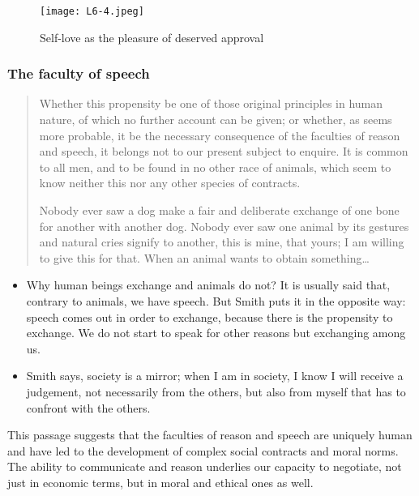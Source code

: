             \begin{figure}[h]
                \centering
                \texttt{[image: L6-4.jpeg]}
                \caption{Self-love as the pleasure of  deserved approval}
                \label{fig:enter-label}
            \end{figure}

\newpage
        \subsubsection{The faculty of speech}

            \begin{quote}
                Whether this propensity be one of those original principles in human nature, of which no further account can be given; or whether, as seems more probable, it be the necessary consequence of the faculties of reason and speech, it belongs not to our present subject to enquire. It is common to all men, and to be found in no other race of animals, which seem to know neither this nor any other species of contracts.
                
                Nobody ever saw a dog make a fair and deliberate exchange of one bone for another with another dog. Nobody ever saw one animal by its gestures and natural cries signify to another, this is mine, that yours; I am willing to give this for that. When an animal wants to obtain something…
            \end{quote}

             \begin{itemize}
                \item Why human beings exchange and animals do not? It is usually said that, contrary to animals, we have speech. But Smith puts it in the opposite way: speech comes out in order to exchange, because there is the propensity to exchange. We do not start to speak for other reasons but exchanging among us. 
                \item Smith says, society is a mirror; when I am in society, I know I will receive a judgement, not necessarily from the others, but also from myself that has to confront with the others.
            \end{itemize}

            This passage suggests that the faculties of reason and speech are uniquely human and have led to the development of complex social contracts and moral norms. The ability to communicate and reason underlies our capacity to negotiate, not just in economic terms, but in moral and ethical ones as well.

